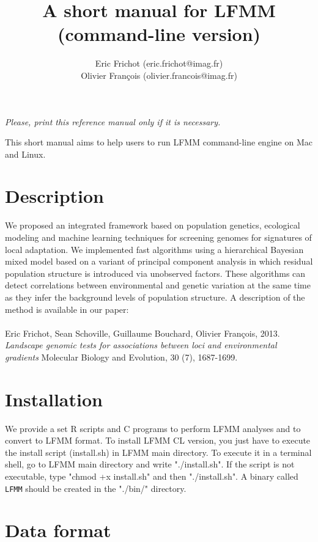 \documentclass[10pt,a4paper]{article}
\title{\bf \Large A short manual for LFMM\\
\large (command-line version)
}
\author{
        Eric Frichot (eric.frichot@imag.fr)\\
	Olivier François (olivier.francois@imag.fr)\\
}
\begin{document}
\maketitle
\begin{center}
{\it Please, print this reference manual only if it is necessary.}
\end{center}

\noindent
This short manual aims to help users to run LFMM command-line engine on Mac and Linux. 

\tableofcontents

\section{Description} 
We proposed an integrated framework based on population genetics, ecological modeling and machine 
learning techniques for screening genomes for signatures of local adaptation. We implemented fast 
algorithms using a hierarchical Bayesian mixed model based on a variant of principal component 
analysis in which residual population structure is introduced via unobserved factors. These 
algorithms can detect correlations between environmental and genetic variation at the same time 
as they infer the background levels of population structure. A description of the method is available in our paper:
\\
\\
\noindent
Eric Frichot, Sean Schoville, Guillaume Bouchard, Olivier François, 2013. {\it Landscape genomic tests for associations between loci and environmental gradients} Molecular Biology and Evolution, 30 (7), 1687-1699. 

\section{Installation} 

We provide a set R scripts and C programs to perform LFMM analyses and to convert to LFMM format.
To install LFMM CL version, you just have to execute the install script (install.sh) 
in LFMM main directory.
To execute it in a terminal shell, go to LFMM main directory and write "./install.sh".
If the script is not executable, type "chmod +x install.sh" and then "./install.sh".
A binary called \verb|LFMM| should be created in the "./bin/" directory.

\section{Data format}
\end{document}
